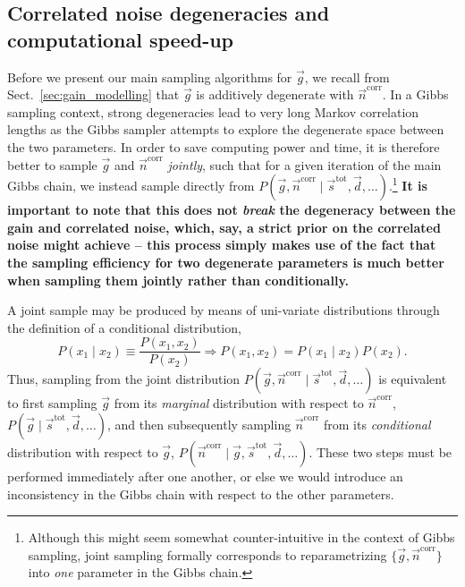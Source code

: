 \documentclass[twocolumn]{aa}
\renewcommand{\d}[0]{\vec{d}}
\newcommand{\n}[0]{\vec{n}}
\newcommand{\s}[0]{\vec{s}}
\newcommand{\g}[0]{\vec{g}}
\newcommand{\tot}[0]{^{\mathrm{tot}}}
\newcommand{\corr}[0]{^{\mathrm{corr}}}
\begin{document}
\subsection{Correlated noise degeneracies and computational speed-up}
\label{sec:corrnoise}

Before we present our main sampling algorithms for $\g$, we recall from
Sect.~\ref{sec:gain_modelling} that $\g$ is additively degenerate with
$\n\corr$. In a Gibbs sampling context, strong degeneracies lead to
very long Markov correlation lengths as the Gibbs sampler attempts to
explore the degenerate space between the two parameters. In order to
save computing power and time, it is therefore better to sample $\g$
and $\n\corr$ \emph{jointly}, such that for a given iteration of the
main Gibbs chain, we instead sample directly from $P(\g,
\n\corr\mid\s\tot, \d, \ldots)$.\footnote{Although this might seem somewhat
  counter-intuitive in the context of Gibbs sampling, joint sampling
  formally corresponds to reparametrizing $\{\g, \n\corr\}$ into
  \emph{one} parameter in the Gibbs chain.} \textbf{It is important to note that this does not \emph{break} the degeneracy between the gain and correlated noise, which, say, a strict prior on the correlated noise might achieve -- this process simply makes use of the fact that the sampling efficiency for two degenerate parameters is much better when sampling them jointly rather than conditionally.}

A joint sample may be produced by means of uni-variate distributions
through the definition of a conditional distribution,
\begin{equation}
	P(x_1\mid x_2) \equiv \frac{P(x_1, x_2)}{P(x_2)} \Rightarrow P(x_1, x_2) = P(x_1\mid x_2)P(x_2).
\end{equation}
Thus, sampling from the joint distribution $P(\g, \n\corr\mid \s\tot, \d, \ldots)$ is equivalent to
first sampling $\g$ from its \emph{marginal} distribution with respect
to $\n\corr$, $P(\g\mid \s\tot, \d, \ldots)$, and then subsequently
sampling $\n\corr$ from its \emph{conditional} distribution with
respect to $\g$, $P(\n\corr\mid\g, \s\tot, \d, \ldots)$. These two steps must
be performed immediately after one another, or else we would introduce
an inconsistency in the Gibbs chain with respect to the other parameters.
\end{document}
